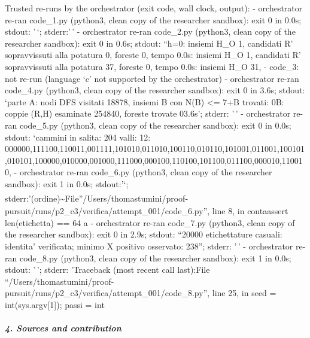 \documentclass[11pt,a4paper]{article}
\begin{document}
Trusted re-runs by the orchestrator (exit code, wall clock, output): -
orchestrator re-ran code\_1.py (python3, clean copy of the researcher
sandbox): exit 0 in 0.0s; stdout: '\,`; stderr:'\,' - orchestrator
re-ran code\_2.py (python3, clean copy of the researcher sandbox): exit
0 in 0.6s; stdout: ``h=0: insiemi H\_O 1, candidati R' sopravvissuti
alla potatura 0, foreste 0, tempo 0.0s: insiemi H\_O 1, candidati
R' sopravvissuti alla potatura 37, foreste 0, tempo 0.0s: insiemi
H\_O 31, - code\_3: not re-run (language `c' not supported by the
orchestrator) - orchestrator re-ran code\_4.py (python3, clean copy of
the researcher sandbox): exit 0 in 3.6s; stdout: `parte A: nodi DFS
visitati 18878, insiemi B con \textbar N(B)\textbar{} \textless=
7+\textbar B\textbar{} trovati: 0\nparte B: coppie (R,H) esaminate
254840, foreste trovate 0\ntempo 3.6s'; stderr: '\,' - orchestrator
re-ran code\_5.py (python3, clean copy of the researcher sandbox): exit
0 in 0.0s; stdout: `cammini in salita: 204 valli: 12\nordine:
000000,111100,110011,001111,101010,011010,100110,010110,101001,011001,100101,010101,100000,010000,001000,111000,000100,110100,101100,011100,000010,110010,
- orchestrator re-ran code\_6.py (python3, clean copy of the researcher
sandbox): exit 1 in 0.0s; stdout:'`;
stderr:'(ordine)\n                      \textsubscript{}\textasciitilde{}\textsuperscript{}\n  File''/Users/thomastumini/proof-pursuit/runs/p2\_c3/verifica/attempt\_001/code\_6.py'',
line 8, in conta\n    assert len(etichetta) == 64 a - orchestrator
re-ran code\_7.py (python3, clean copy of the researcher sandbox): exit
0 in 2.9s; stdout: ``20000 etichettature casuali: identita' verificata;
minimo X positivo osservato: 238''; stderr: '\,' - orchestrator re-ran
code\_8.py (python3, clean copy of the researcher sandbox): exit 1 in
0.0s; stdout: '\,'; stderr: 'Traceback (most recent call last):\n  File
``/Users/thomastumini/proof-pursuit/runs/p2\_c3/verifica/attempt\_001/code\_8.py'',
line 25, in \n    seed = int(sys.argv{[}1{]}); passi = int

\subparagraph{4. Sources and
contribution}\label{sources-and-contribution}
\end{document}
